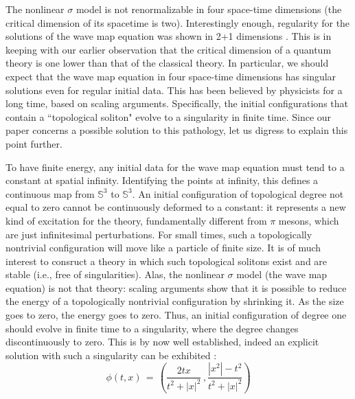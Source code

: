 \documentclass{amsart}
\begin{document}
The nonlinear $\sigma$ model is not renormalizable in four space-time dimensions (the critical dimension of its spacetime is two). Interestingly enough, regularity for the solutions of the wave map equation was shown in 2+1 dimensions \cite{G, SZ1, SZ2}. This is in keeping with our earlier observation that  the critical dimension of a quantum theory is one lower than that of the classical theory. In particular, we should expect that the wave map equation in four space-time dimensions has singular solutions even for regular initial data. This has been believed by physicists for a long time, based on scaling arguments. Specifically, the initial configurations that contain a ``topological soliton" evolve to a singularity in finite time. Since our paper concerns a possible solution to this pathology, let us digress to explain this point further.

To have finite energy, any initial data for the wave map equation must tend to a constant at spatial infinity. Identifying the points at infinity, this defines a continuous map from $\mathbb{S}^3$ to $\mathbb{S}^3$. An initial configuration of topological degree not equal to zero cannot be continuously deformed to a constant: it represents a new kind of excitation for the theory, fundamentally different from $\pi$ mesons, which are just infinitesimal perturbations. For small times, such a topologically nontrivial configuration will move like a particle of finite size. It is of much interest to consruct a theory in which such topological solitons exist and are stable (i.e., free of singularities). Alas, the nonlinear $\sigma$ model (the wave map equation) is not that theory: scaling arguments show that it is possible to reduce the energy of a topologically nontrivial configuration by shrinking it. As the size goes to zero, the energy goes to zero. Thus, an initial configuration of degree one should evolve in finite time to a singularity, where the degree changes discontinuously to zero. This is by now well established, indeed an explicit solution with such  a singularity can be exhibited \cite{TS}:
 \begin{equation}
\phi(t,x)\,=\,\left(\frac{2tx}{t^2+|x|^2}\,, \frac{|x^2|-t^2}{t^2+|x|^2}\right)
\end{equation}
\end{document}
